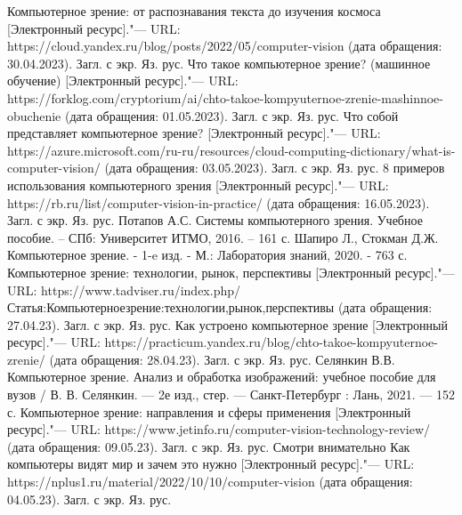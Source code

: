 \documentclass[bachelor, och, referat, times]{SCWorks}
\begin{document}
%
\begin{thebibliography}{99}
 Компьютерное зрение: от распознавания текста до изучения космоса [Электронный ресурс]."--- URL: https://cloud.yandex.ru/blog/posts/2022/05/computer-vision (дата обращения: 30.04.2023). Загл. с экр. Яз. рус.
 Что такое компьютерное зрение? (машинное обучение) [Электронный ресурс]."--- URL: https://forklog.com/cryptorium/ai/chto-takoe-kompyuternoe-zrenie-mashinnoe-obuchenie (дата обращения: 01.05.2023). Загл. с экр. Яз. рус.
 Что собой представляет компьютерное зрение? [Электронный ресурс]."--- URL: https://azure.microsoft.com/ru-ru/resources/cloud-computing-dictionary/what-is-computer-vision/ (дата обращения: 03.05.2023). Загл. с экр. Яз. рус.
 8 примеров использования компьютерного зрения [Электронный ресурс]."--- URL: https://rb.ru/list/computer-vision-in-practice/ (дата обращения: 16.05.2023). Загл. с экр. Яз. рус.
 Потапов А.С. Системы компьютерного зрения. Учебное пособие. – СПб: Университет ИТМО, 2016. – 161 с.
 Шапиро Л., Стокман Д.Ж. Компьютерное зрение. - 1-e изд. - М.: Лаборатория знаний, 2020. - 763 с.
 Компьютерное зрение: технологии, рынок, перспективы [Электронный ресурс]."--- URL: https://www.tadviser.ru/index.php/Статья:Компьютерноезрение:технологии,рынок,перспективы (дата обращения: 27.04.23). Загл. с экр. Яз. рус.
 Как устроено компьютерное зрение [Электронный ресурс]."--- URL: https://practicum.yandex.ru/blog/chto-takoe-kompyuternoe-zrenie/ (дата обращения: 28.04.23). Загл. с экр. Яз. рус.
 Селянкин В.В. Компьютерное зрение. Анализ и обработка изображений: учебное пособие для вузов / В. В. Селянкин. — 2е изд., стер. — Санкт-Петербург : Лань, 2021. — 152 с.
 Компьютерное зрение: направления и сферы применения [Электронный ресурс]."--- URL: https://www.jetinfo.ru/computer-vision-technology-review/ (дата обращения: 09.05.23). Загл. с экр. Яз. рус.
 Смотри внимательно Как компьютеры видят мир и зачем это нужно [Электронный ресурс]."--- URL: https://nplus1.ru/material/2022/10/10/computer-vision (дата обращения: 04.05.23). Загл. с экр. Яз. рус.
  
\end{thebibliography}
\end{document}
